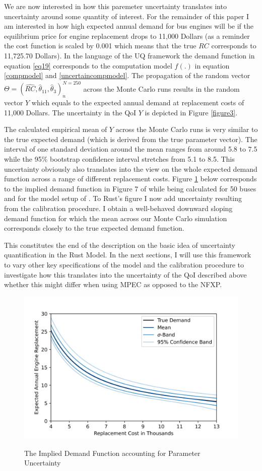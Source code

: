 We are now interested in how this paremeter uncertainty translates into uncertainty around some quantity of interest. For the remainder of this paper I am interested in how high expected annual demand for bus engines will be if the equilibrium price for engine replacement drops to 11,000 Dollars (as a reminder the cost function is scaled by 0.001 which means that the true $RC$ corresponds to 11,725.70 Dollars). In the language of the UQ framework the demand function in equation \ref{eq19} corresponds to the computation model $f(.)$ in equation \ref{compmodel} and \ref{uncertaincompmodel}. The propagation of the random vector $\Theta = (\hat{RC}, \hat\theta_{11}, \hat\theta_3)^{N=250}_n$ across the Monte Carlo runs results in the random vector $Y$ which equals to the expected annual demand at replacement costs of 11,000 Dollars. The uncertainty in the QoI $Y$ is depicted in Figure \ref{figure3}.


The calculated empirical mean of $Y$ across the Monte Carlo runs is very similar to the true expected demand (which is derived from the true parameter vector). The interval of one standard deviation around the mean ranges from around 5.8 to 7.5 while the 95\% bootstrap confidence interval stretches from 5.1 to 8.5. This uncertainty obviously also translates into the view on the whole expected demand function across a range of different replacement costs. Figure \ref{figure4} below corresponds to the implied demand function in Figure 7 of \cite{Rust.1987} while being calculated for 50 buses and for the model setup of \cite{Iskhakov.2016}. To Rust's figure I now add uncertainty resulting from the calibration procedure. I obtain a well-behaved downward sloping demand function for which the mean across our Monte Carlo simulation corresponds closely to the true expected demand function.

This constitutes the end of the description on the basic idea of uncertainty quantification in the Rust Model. In the next sections, I will use this framework to vary other key specifications of the model and the calibration procedure to investigate how this translates into the uncertainty of the QoI described above whether this might differ when using MPEC as opposed to the NFXP.

\begin{figure}[H]
	\caption{The Implied Demand Function accounting for Parameter Uncertainty}
	\vspace*{-4mm}
	\centering
	\includegraphics[scale=0.9]{../figures/figure_4.png}
	\label{figure4}
\end{figure}








